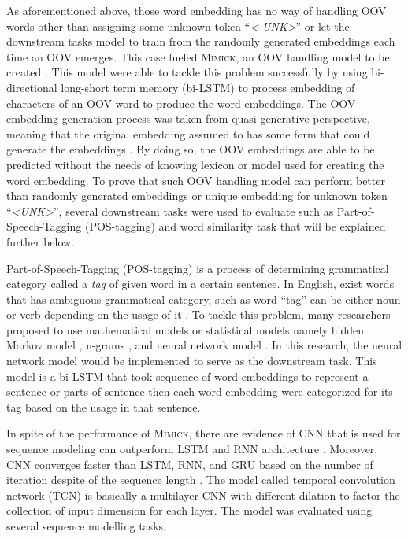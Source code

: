 As aforementioned above, those word embedding has no way of handling
OOV words other than assigning some unknown token ``\textit{\textless
UNK\textgreater}'' or let the downstream tasks model to train from the
randomly generated embeddings each time an OOV emerges. This case
fueled \textsc{Mimick}, an OOV handling model to be created
\citep{mimicking2017Pinter}. This model were able to tackle this
problem successfully by using bi-directional long-short term memory
(bi-LSTM) to process embedding of characters of an OOV word to produce
the word embeddings. The OOV embedding generation process was taken
from quasi-generative perspective, meaning that the original embedding
assumed to has some form that could generate the embeddings
\citep{mimicking2017Pinter}. By doing so, the OOV embeddings are able
to be predicted without the needs of knowing lexicon or model used for
creating the word embedding. To prove that such OOV handling model can
perform better than randomly generated embeddings or unique embedding
for unknown token ``\textit{\textless UNK\textgreater}'', several
downstream tasks were used to evaluate such as Part-of-Speech-Tagging
(POS-tagging) and word similarity task that will be explained further
below.

Part-of-Speech-Tagging (POS-tagging) is a process of determining
grammatical category called a \textit{tag} of given word in a certain
sentence. In English, exist words that has ambiguous grammatical
category, such as word ``tag'' can be either noun or verb depending on
the usage of it \citep{apractical1992cutting}. To tackle this problem,
many researchers proposed to use mathematical models or statistical
models namely hidden Markov model \citep{apractical1992cutting},
n-grams \citep{tnt2000Brants}, and neural network model
\citep{finding2015ling}. In this research, the neural network model
would be implemented to serve as the downstream task. This model is a
bi-LSTM that took sequence of word embeddings to represent a sentence
or parts of sentence then each word embedding were categorized for its
tag based on the usage in that sentence.

In spite of the performance of \textsc{Mimick}, there are evidence
of CNN that is used for sequence modeling can outperform LSTM and
RNN architecture \citep{empirical2018shaujie}. Moreover, CNN converges
faster than LSTM, RNN, and GRU based on the number of iteration
despite of the sequence length \citep{empirical2018shaujie}. The model
called temporal convolution network (TCN) is basically a multilayer
CNN with different dilation to factor the collection of input
dimension for each layer. The model was evaluated using several
sequence modelling tasks.

